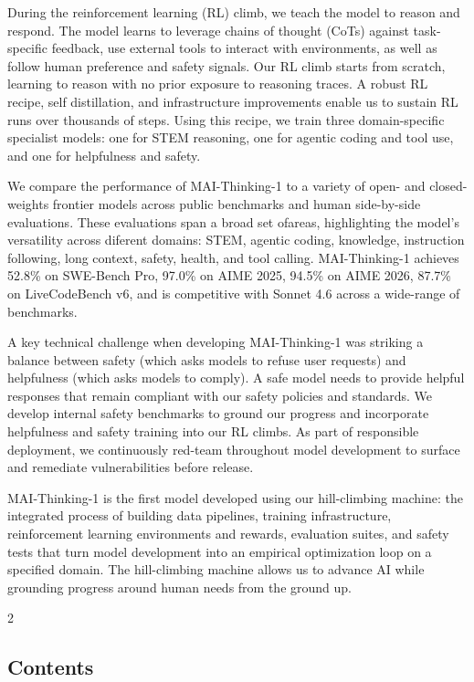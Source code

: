 \documentclass[
  10
]{article}
\begin{document}
During the reinforcement learning (RL) climb, we teach the model to
reason and respond. The model learns to leverage chains of thought
(CoTs) against task-specific feedback, use external tools to interact
with environments, as well as follow human preference and safety
signals. Our RL climb starts from scratch, learning to reason with no
prior exposure to reasoning traces. A robust RL recipe, self
distillation, and infrastructure improvements enable us to sustain RL
runs over thousands of steps. Using this recipe, we train three
domain-specific specialist models: one for STEM reasoning, one for
agentic coding and tool use, and one for helpfulness and safety.

We compare the performance of MAI-Thinking-1 to a variety of open- and
closed-weights frontier models across public benchmarks and human
side-by-side evaluations. These evaluations span a broad set ofareas,
highlighting the model's versatility across diferent domains: STEM,
agentic coding, knowledge, instruction following, long context, safety,
health, and tool calling. MAI-Thinking-1 achieves 52.8\% on SWE-Bench
Pro, 97.0\% on AIME 2025, 94.5\% on AIME 2026, 87.7\% on LiveCodeBench
v6, and is competitive with Sonnet 4.6 across a wide-range of
benchmarks.

A key technical challenge when developing MAI-Thinking-1 was striking a
balance between safety (which asks models to refuse user requests) and
helpfulness (which asks models to comply). A safe model needs to provide
helpful responses that remain compliant with our safety policies and
standards. We develop internal safety benchmarks to ground our progress
and incorporate helpfulness and safety training into our RL climbs. As
part of responsible deployment, we continuously red-team throughout
model development to surface and remediate vulnerabilities before
release.

MAI-Thinking-1 is the first model developed using our hill-climbing
machine: the integrated process of building data pipelines, training
infrastructure, reinforcement learning environments and rewards,
evaluation suites, and safety tests that turn model development into an
empirical optimization loop on a specified domain. The hill-climbing
machine allows us to advance AI while grounding progress around human
needs from the ground up.

2

\subsection{Contents}\label{contents}
\end{document}
